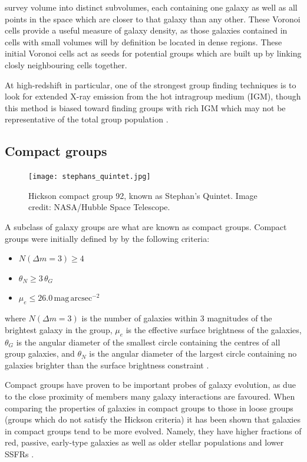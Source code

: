 survey volume into distinct subvolumes, each containing one
galaxy as well as all points in the space which are closer to that
galaxy than any other.  These Voronoi cells provide a useful measure
of galaxy density, as those galaxies contained in cells with small
volumes will by definition be located in dense regions.  These initial
Voronoi cells act as seeds for potential groups which are built up by
linking closly neighbouring cells together.
\par
At high-redshift in particular, one of the strongest group finding
techniques is to look for extended X-ray emission from the hot
intragroup medium (IGM), though this method is biased toward finding
groups with rich IGM which may not be representative of the total
group population \citep{connelly2012}.

\subsection{Compact groups}
\label{sec:compact_groups}

\begin{figure}[!ht]
  \centering
  \texttt{[image: stephans\_quintet.jpg]}
  \caption[Hickson compact group 92, known as Stephan's
    Quintet]{Hickson compact group 92, known as Stephan's Quintet. 
    Image credit: NASA/Hubble Space Telescope.}
  \label{fig:steph_quintet}
\end{figure}

A subclass of galaxy groups are what are known as compact groups.
Compact groups were initially defined by \citet{hickson1982} by the
following criteria:

\begin{itemize}
  \item $N(\Delta m = 3) \ge 4$

  \item $\theta_N \ge 3\,\theta_G$

  \item $\mu_e \le 26.0\,\mathrm{mag}\,\mathrm{arcsec^{-2}}$
\end{itemize}

\noindent
where $N(\Delta m = 3)$ is the number of galaxies within 3 magnitudes
of the brightest galaxy in the group, $\mu_e$ is the effective surface
brightness of the galaxies, $\theta_G$ is the angular diameter of the
smallest circle containing the centres of all group galaxies, and
$\theta_N$ is the angular diameter of the largest circle containing no
galaxies brighter than the surface brightness constraint
\citep{hickson1982, mcconnachie2009}.
\par
Compact groups have proven to be important probes of galaxy evolution,
as due to the close proximity of members many galaxy interactions are
favoured.  When comparing the properties of galaxies in compact groups
to those in loose groups (groups which do not satisfy the Hickson
criteria) it has been shown that galaxies in compact groups tend to be
more evolved.  Namely, they have higher fractions of red, passive,
early-type galaxies as well as older stellar populations and lower
SSFRs \citep{coenda2012, coenda2015}.

